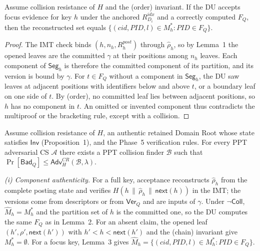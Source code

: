 \begin{lemma}
Assume collision resistance of $H$ and the (order) invariant. If the DU accepts focus evidence for key
$h$ under the anchored $R^{idx}_{D_i}$ and a correctly computed $F_Q$, then the reconstructed set equals
$\{(cid,PID,l) \in M_h^{*} : PID \in F_Q\}$.
\end{lemma}
\begin{proof}
The IMT check binds $(h, n_h, R^{post}_h)$ through $\hat{\rho}_h$, so by Lemma~1 the opened leaves are
the committed $\gamma$ at their positions among $n_h$ leaves. Each component of $\mathsf{Seg}_h$ is
therefore the committed component of its partition, and its version is bound by $\gamma$. For
$t \in F_Q$ without a component in $\mathsf{Seg}_h$, the DU saw leaves at adjacent positions with
identifiers below and above $t$, or a boundary leaf on one side of $t$. By (order), no committed leaf
lies between adjacent positions, so $h$ has no component in $t$. An omitted or invented component thus
contradicts the multiproof or the bracketing rule, except with a collision.
\end{proof}



\begin{theorem}
Assume collision resistance of $H$, an authentic retained Domain Root whose state satisfies
$\mathsf{Inv}$ (Proposition~1), and the Phase~5 verification rules. For every PPT adversarial CS
$\mathcal{A}$ there exists a PPT collision finder $\mathcal{B}$ such that
$\Pr[\mathsf{Bad}_Q] \le \mathsf{Adv}^{CR}_H(\mathcal{B},\lambda)$.
\end{theorem}


\emph{(i) Component authenticity.} For a full key, acceptance reconstructs $\hat{\rho}_h$ from the
complete posting state and verifies $H(h \,\|\, \hat{\rho}_h \,\|\, \mathsf{next}(h))$ in the IMT; the
versions come from descriptors or from $\mathsf{Ver}_Q$ and are inputs of $\gamma$. Under
$\neg\mathsf{Coll}$, $\hat{M}_h = M_h^{*}$ and the partition set of $h$ is the committed one, so the DU
computes the same $F_Q$ as in Lemma~2. For an absent claim, the opened leaf $(h',\rho',\mathsf{next}(h'))$
with $h' < h < \mathsf{next}(h')$ and the (chain) invariant give $M_h^{*} = \emptyset$. For a focus key,
Lemma~3 gives $\hat{M}_h = \{(cid,PID,l) \in M_h^{*} : PID \in F_Q\}$.

